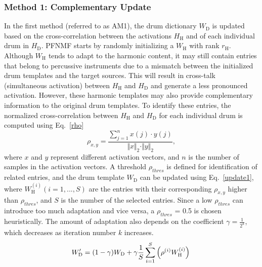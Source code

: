 \documentclass{article}
\begin{document}
\subsubsection{Method 1: Complementary Update}\label{subsubsec:method1}
In the first method (referred to as AM1), the drum dictionary $W_\mathrm{D}$ is updated based on the cross-correlation between the activations $H_\mathrm{H}$ and of each individual drum in $H_\mathrm{D}$. PFNMF starts by randomly initializing a $W_\mathrm{H}$ with rank $r_\mathrm{H}$. Although $W_\mathrm{H}$ tends to adapt to the harmonic content, it may still contain entries that belong to percussive instruments due to a mismatch between the initialized drum templates and the target sources. This will result in cross-talk (simultaneous activation) between $H_\mathrm{H}$ and $H_\mathrm{D}$ and generate a less pronounced activation. However, these harmonic templates may also provide complementary information to the original drum templates. To identify these entries, the normalized cross-correlation between $H_\mathrm{H}$ and $H_\mathrm{D}$ for each individual drum is computed using Eq.~\eqref{rho}
\begin{equation}\label{rho}
\rho_{x, y} = \frac{\sum_{j=1}^n x(j)\cdot y(j)}{\Vert x \Vert_2 \cdot \Vert y \Vert_2},
\end{equation}    
where $x$ and $y$ represent different activation vectors, and $n$ is the number of samples in the activation vectors. A threshold $\rho_{thres}$ is defined for identification of related entries, and the drum template $W_\mathrm{D}$ can be updated using Eq.~\eqref{update1}, where $W_\mathrm{H}^{(i)} (i = 1, ..., S)$ are the entries with their corresponding $\rho_{x, y}$ higher than $\rho_{thres}$, and $S$ is the number of the selected entries. Since a low $\rho_{thres}$ can introduce too much adaptation and vice versa, a $\rho_{thres}$ = 0.5 is chosen heuristically. The amount of adaptation also depends on the coefficient $\gamma = \frac{1}{2^{k}}$, which decreases as iteration number $k$ increases. 
%
\begin{equation}
\label{update1}
W_\mathrm{D}^{\prime} = (1 - \gamma) W_\mathrm{D} + \gamma \frac{1}{S} \sum_{i=1}^S\left(\rho^{(i)} W_\mathrm{H}^{(i)}\right)\\
\end{equation}
\end{document}
